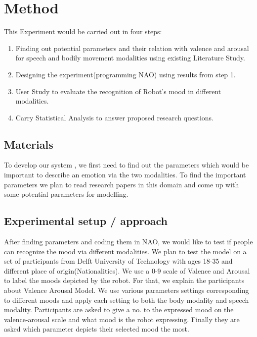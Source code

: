 \documentclass[runningheads]{llncs}
\begin{document}
\section{Method}
This Experiment would be carried out in four steps:
\begin{enumerate}
    \item Finding out potential parameters and their relation with valence and arousal for speech and bodily movement modalities using existing Literature Study.
    \item Designing the experiment(programming NAO) using results from step 1.
    \item User Study to evaluate the recognition of Robot's mood in different modalities.
    \item Carry Statistical Analysis to answer proposed research questions.
\end{enumerate}

\subsection{Materials}
To develop our system , we first need to find out the parameters which would be important to describe an emotion via the two modalities.
To find the important parameters we plan to read research papers in this domain and come up with some potential parameters for modelling.

\subsection{Experimental setup / approach}
After finding parameters and coding them in NAO, we would like to test if people can recognize the mood via different modalities. We plan to test the model on a set of participants from Delft University of Technology with ages 18-35 and different place of origin(Nationalities). We use a 0-9 scale of Valence and Arousal to label the moods depicted by the robot. For that, we explain the participants about Valence Arousal Model. We use various parameters settings corresponding to different moods and apply each setting to both the body modality and speech modality. Participants are asked to give a no. to the expressed mood on the valence-arousal scale and what mood is the robot expressing. Finally they are asked which parameter depicts their selected mood the most.
\end{document}

